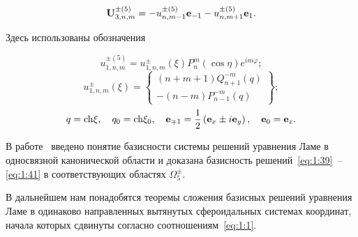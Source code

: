 \begin{equation}\label{eq:1:44}
{\bf{U}}_{3,n,m}^{ \pm (5)} =  - u_{n,m - 1}^{ \pm (5)}{{\bf{e}}_{ - 1}} - u_{n,m + 1}^{ \pm (5)}{{\bf{e}}_1}.
\end{equation}

Здесь использованы обозначения

\begin{equation*}
u_{1,n,m}^{ \pm (5)} = u_{1,n,m}^ \pm (\xi )P_n^m(\cos \eta ){e^{im\varphi }};
\end{equation*}
\begin{equation*}
u_{1,n,m}^ \pm (\xi ) = \left\{ \begin{array}{l}
(n + m + 1)Q_{n + 1}^{ - m}(q)\\
 - (n - m)P_{n - 1}^{ - m}(q)
\end{array} \right\};
\end{equation*}
\begin{equation}\label{eq:1:45}
q = {\mathop{\rm ch}\nolimits} \xi ,\quad {q_0} = {\mathop{\rm ch}\nolimits} {\xi _0},\quad {{\bf{e}}_{ \mp 1}} = \frac{1}{2}\left( {{{\bf{e}}_x} \pm i{{\bf{e}}_y}} \right),\quad {{\bf{e}}_0} = {{\bf{e}}_z}.
\end{equation}

В работе~\cite{Nikolaev1998} введено понятие базисности системы решений уравнения Ламе в односвязной канонической области и доказана базисность решений~\eqref{eq:1:39}~-- \eqref{eq:1:41} в соответствующих областях $\Omega _5^ \pm $.{\sloppy\par}

В дальнейшем нам понадобятся теоремы сложения базисных решений уравнения Ламе в одинаково направленных вытянутых сфероидальных системах координат, начала которых сдвинуты согласно соотношениям~\eqref{eq:1:1}.

